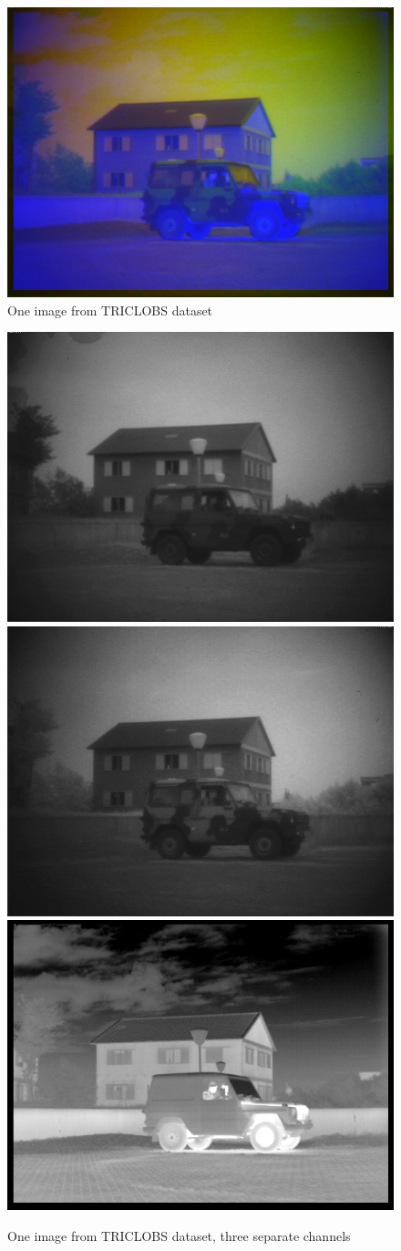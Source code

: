 \documentclass[10pt,twocolumn,letterpaper]{article}
\begin{document}
	\begin{figure}
		\includegraphics[width=\columnwidth]{images/TRI_A1/fusion.png}
		\caption{One image from TRICLOBS dataset}\label{fig:triclobs-fusion}
	\end{figure}
	\begin{figure}
		\includegraphics[width=0.325\columnwidth]{images/TRI_A1/ch1.png}
		\includegraphics[width=0.325\columnwidth]{images/TRI_A1/ch2.png}
		\includegraphics[width=0.325\columnwidth]{images/TRI_A1/ch3.png}
		\caption{One image from TRICLOBS dataset, three separate channels}\label{fig:triclobs-fusion-channels}
	\end{figure}
\end{document}
